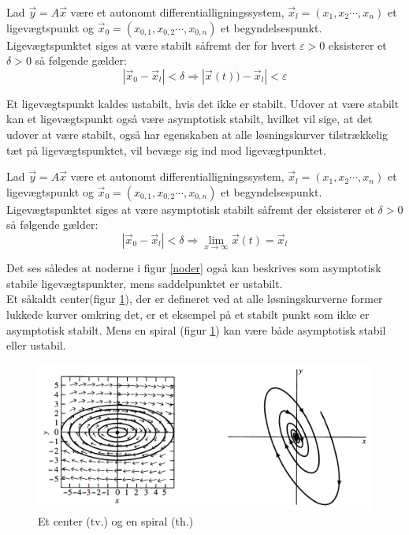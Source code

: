 \begin{definition}
Lad 
$\vec y = A \vec x$
være et autonomt differentialligningssystem, $\vec x_l=(x_1,x_2 \cdots ,x_n)$ et ligevægtspunkt og $\vec x_0=(x_{0,1},x_{0,2} \cdots ,x_{0,n})$ et begyndelsespunkt. Ligevægtspunktet siges at være stabilt såfremt der for hvert $\varepsilon >0$ eksisterer et $\delta >0$ så følgende gælder:
$$|\vec x_0 - \vec x_l|< \delta \Rightarrow |\vec x(t)) - \vec x_l| < \varepsilon $$
\end{definition}
Et ligevægtspunkt kaldes ustabilt, hvis det ikke er stabilt.
Udover at være stabilt kan et ligevægtspunkt også være asymptotisk stabilt, hvilket vil sige, at det udover at være stabilt, også har egenskaben at alle løsningskurver tilstrækkelig tæt på ligevægtspunktet, vil bevæge sig ind mod ligevægtpunktet.

\begin{definition}
Lad 
$\vec y = A \vec x$
være et autonomt differentialligningssystem, $\vec x_l=(x_1,x_2 \cdots ,x_n)$ et ligevægtspunkt og $\vec x_0=(x_{0,1},x_{0,2} \cdots ,x_{0,n})$ et begyndelsespunkt. Ligevægtspunktet siges at være asymptotisk stabilt såfremt der eksisterer et $\delta >0$ så følgende gælder:
$$|\vec x_0 - \vec x_l|< \delta \Rightarrow \lim_{x\to\infty} \vec x(t)= \vec x_l$$
\end{definition}
Det ses således at noderne i figur \ref{noder} også kan beskrives som asymptotisk stabile ligevægtspunkter, mens saddelpunktet er ustabilt. \\
Et såkaldt center(figur \ref{center}), der er defineret ved at alle løsningskurverne former lukkede kurver omkring det, er et eksempel på et stabilt punkt som ikke er asymptotisk stabilt. Mens en spiral (figur \ref{center}) kan være både asymptotisk stabil eller ustabil.

\begin{figure} [H]
    \centering
    \includegraphics{Images/center.png}
    \caption{Et center (tv.) og en spiral (th.) }
    \label{center}
\end{figure}